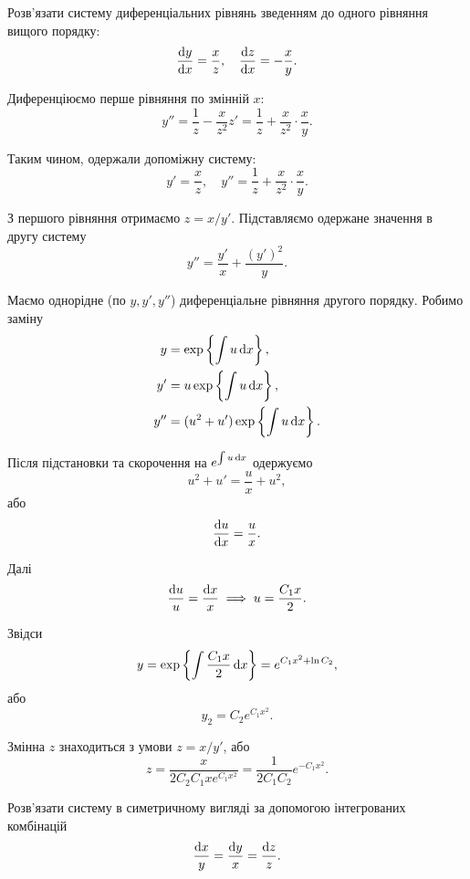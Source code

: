 \begin{example}
	Розв'язати систему диференціальних рівнянь зведенням до одного рівняння вищого порядку: \[ \frac{\mathop{}\!\mathrm{d} y}{\mathop{}\!\mathrm{d} x} = \frac{x}{z}, \quad \frac{\mathop{}\!\mathrm{d} z}{\mathop{}\!\mathrm{d} x} = -\frac{x}{y}.\]
\end{example}

\begin{solution}
	Диференціюємо перше рівняння по змінній $x$:
	\[ y'' = \frac{1}{z} - \frac{x}{z^2} z' = \frac{1}{z} + \frac{x}{z^2} \cdot \frac{x}{y}. \]
	
	Таким чином, одержали допоміжну систему:
	\[ y' = \frac{x}{z}, \quad y'' = \frac{1}{z} + \frac{x}{z^2} \cdot \frac{x}{y}. \]

	З першого рівняння отримаємо $z = x / y'$. Підставляємо одержане значення в другу систему \[ y'' = \frac{y'}{x} + \frac{(y')^2}{y}.\]

	Маємо однорідне (по $y, y', y''$) диференціальне рівняння другого порядку. Робимо заміну \begin{align*} y &= \exp\left\{\int u \mathop{}\!\mathrm{d} x\right\}, \\ y' &= u \exp\left\{\int u \mathop{}\!\mathrm{d} x\right\}, \\ y'' &= (u^2 + u') \exp\left\{\int u \mathop{}\!\mathrm{d} x\right\}. \end{align*}

	Після підстановки та скорочення на $e^{\int u \mathop{}\!\mathrm{d} x}$ одержуємо \[ u^2 + u' = \frac{u}{x} + u^2, \] або \[ \frac{\mathop{}\!\mathrm{d} u}{\mathop{}\!\mathrm{d} x} = \frac{u}{x}. \]

	Далі \[ \frac{\mathop{}\!\mathrm{d} u}{u} = \frac{\mathop{}\!\mathrm{d} x}{x} \implies u = \frac{C_1 x}{2}. \]

	Звідси \[ y = \exp\left\{\int \frac{C_1 x}{2} \mathop{}\!\mathrm{d} x\right\} = e^{C_1 x^2 + \ln C_2}, \] або \[ y_2 = C_2 e^{C_1 x^2}. \]

	Змінна $z$ знаходиться з умови $z = x / y'$, або \[ z = \frac{x}{2 C_2 C_1 x e^{C_1 x^2}} = \frac{1}{2 C_1 C_2} e^{- C_1 x^2}. \]
\end{solution}

\begin{example}
	Розв'язати систему в симетричному вигляді за допомогою інтегрованих комбінацій \[\frac{\mathop{}\!\mathrm{d} x}{y} = \frac{\mathop{}\!\mathrm{d} y}{x} = \frac{\mathop{}\!\mathrm{d} z}{z}.\]
\end{example}

